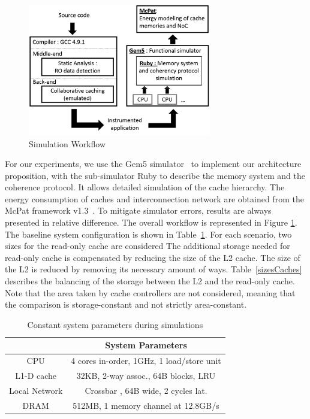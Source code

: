 \documentclass[sigconf]{acmart}
\begin{document}
\begin{figure}
    \centering
    \includegraphics[width=8cm]{./images/workflow.png}
    \caption{Simulation Workflow}
    \label{workflow}
\end{figure}

For our experiments, we use the Gem5 simulator~\cite{Binkert:2011} to
implement our architecture proposition, with the sub-simulator Ruby to
describe the memory system and the coherence protocol. It allows
detailed simulation of the cache hierarchy. The energy consumption of
caches and interconnection network are obtained from the McPat
framework v1.3~\cite{Li:2009}. To mitigate simulator errors, results
are always presented in relative difference. The overall workflow is
represented in Figure \ref{workflow}. The baseline system
configuration is shown in Table~\ref{designs}. For each scenario, two
sizes for the read-only cache are considered
The additional storage needed for read-only cache is compensated by
reducing the size of the L2 cache. The size of the L2 is reduced by
removing its necessary amount of ways. Table~\ref{sizesCaches}
describes the balancing of the storage between the L2 and the
read-only cache. Note that the area taken by cache controllers are not
considered, meaning that the comparison is storage-constant and not
strictly area-constant.

\begin{table}
\centering
\caption{Constant system parameters during simulations}
\label{designs}
\begin{tabular}{ | c | c | }
\hline
\hline
 & System Parameters \\
\hline
CPU & 4 cores in-order, 1GHz, 1 load/store unit\\
\hline
L1-D cache & 32KB, 2-way assoc., 64B blocks, LRU\\
\hline
Local Network& Crossbar , 64B wide, 2 cycles lat.\\
\hline
DRAM  & 512MB, 1 memory channel at 12.8GB/s\\
\hline
\hline
\end{tabular}
\end{table}
\end{document}
